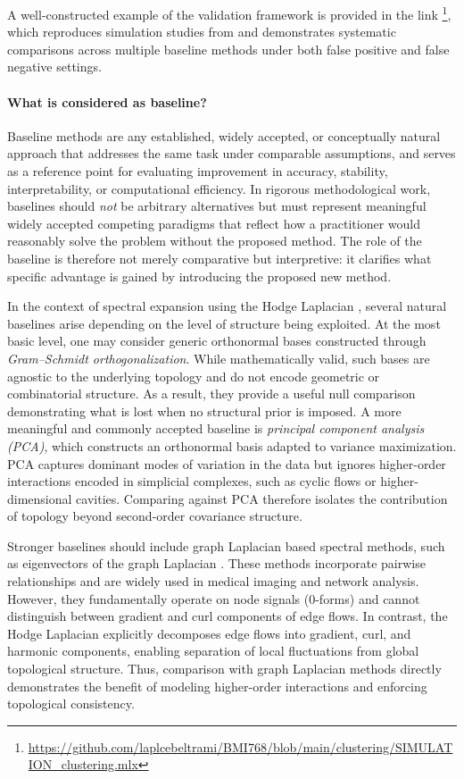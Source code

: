 \documentclass[12pt,portrait]{article}
\begin{document}
A well-constructed example of the validation framework is provided in the link \footnote{\url{https://github.com/laplcebeltrami/BMI768/blob/main/clustering/SIMULATION_clustering.mlx}}, which reproduces simulation studies from \citep{chung.2023.NI, chung.2024.PLOS} and demonstrates systematic comparisons across multiple baseline methods under both false positive and false negative settings.  



\paragraph{What is considered as baseline?} Baseline methods are any established, widely accepted, or conceptually natural approach that addresses the same task under comparable assumptions, and serves as a reference point for evaluating improvement in accuracy, stability, interpretability, or computational efficiency. In rigorous methodological work, baselines should {\it not} be arbitrary alternatives but must represent meaningful widely accepted competing paradigms that reflect how a practitioner would reasonably solve the problem without the proposed method. The role of the baseline is therefore not merely comparative but interpretive: it clarifies what specific advantage is gained by introducing the proposed new method.

In the context of spectral expansion using the Hodge Laplacian \citep{anand.2023.TMI}, several natural baselines arise depending on the level of structure being exploited. At the most basic level, one may consider generic orthonormal bases constructed through {\it Gram–Schmidt orthogonalization}. While mathematically valid, such bases are agnostic to the underlying topology and do not encode geometric or combinatorial structure. As a result, they provide a useful null comparison demonstrating what is lost when no structural prior is imposed. A more meaningful and commonly accepted baseline is {\it principal component analysis (PCA)}, which constructs an orthonormal basis adapted to variance maximization. PCA captures dominant modes of variation in the data but ignores higher-order interactions encoded in simplicial complexes, such as cyclic flows or higher-dimensional cavities. Comparing against PCA therefore isolates the contribution of topology beyond second-order covariance structure.

Stronger baselines should include graph Laplacian based spectral methods, such as eigenvectors of the graph Laplacian \citep{chung.2019.BNA}. These methods incorporate pairwise relationships and are widely used in medical imaging and network analysis. However, they fundamentally operate on node signals (0-forms) and cannot distinguish between gradient and curl components of edge flows. In contrast, the Hodge Laplacian explicitly decomposes edge flows into gradient, curl, and harmonic components, enabling separation of local fluctuations from global topological structure. Thus, comparison with graph Laplacian methods directly demonstrates the benefit of modeling higher-order interactions and enforcing topological consistency.
\end{document}
